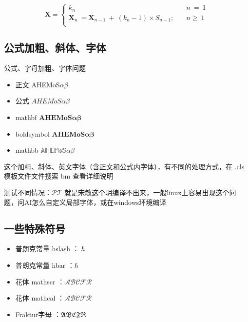 \begin{equation}\label{eq:multi}
    \mathbf{X}=
    \begin{cases}
        k_n \quad & n \ = \ 1  \\
        \mathbf{X}_n \ = \mathbf{X}_{n-1}\ +\ (k_n-1)\times S_{n-1};
        \quad     & n \geq \ 1 \\
    \end{cases}
\end{equation}

\subsection{公式加粗、斜体、字体}

公式、字母加粗、字体问题

\begin{itemize}
    \item[1.] 正文 \qquad \quad AHEMoS$\alpha \beta$
    \item[2.] 公式 \qquad \quad $AHEMoS \alpha \beta$
    \item[3.] mathbf \qquad $\mathbf{AHEMoS\alpha \beta}$
    \item[4.] boldsymbol $\boldsymbol{AHEMoS\alpha \beta}$
    \item[5.] mathbb \qquad $\mathbb{AHEMoS\alpha \beta}$
\end{itemize}

这个加粗、斜体、英文字体（含正文和公式内字体），有不同的处理方式，在 .cls 模板文件文件搜索 bm 查看详细说明


测试不同情况：$\mathcal{P}\mathcal{T}$ 就是宋敏这个玥编译不出来，一般linux上容易出现这个问题，问AI怎么自定义局部字体，或在windows环境编译

\subsection{一些特殊符号}

\begin{itemize}
    \item 普朗克常量 hslash ：$\hslash$
    \item 普朗克常量 hbar ：$\hbar$
    \item 花体 mathscr ：$\mathscr{ABCFR}$
    \item 花体 mathcal ：$\mathcal{ABCFR}$
    \item Fraktur字母 ：$\mathfrak{ABCFR}$
\end{itemize}


